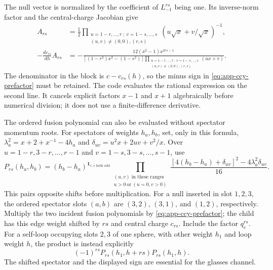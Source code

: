 The null vector is normalized by the coefficient of $L_{-1}^{rs}$ being
one. Its inverse-norm factor and the central-charge Jacobian give
\begin{align}
 A_{rs}&=\frac12
 \prod_{\substack{u=1-r,\ldots,r\ ;\ v=1-s,\ldots,s\\
                    (u,v)\ne(0,0),(r,s)}}
             (u\sqrt x+v/\sqrt x)^{-1},\nonumber\\
 -\frac{dc_{rs}}{dh}A_{rs}
 &=-\frac{12(x^2-1)x^{2rs-1}}
 {[(1-r^2)x^2-(1-s^2)]
  \displaystyle\prod_{\substack{u=1-r,\ldots,r\ ;\ v=1-s,\ldots,s\\
                    (u,v)\ne(0,0),(r,s)}}(ux+v)}.
 \label{eq:app-ccy-prefactor}
\end{align}
The denominator in the block is $c-c_{rs}(h)$, so the minus sign in
\eqref{eq:app-ccy-prefactor} must be retained. The code evaluates the
rational expression on the second line. It cancels explicit factors
$x-1$ and $x+1$ algebraically before numerical division; it does not
use a finite-difference derivative.

The ordered fusion polynomial can also be evaluated without spectator
momentum roots. For spectators of weights $h_a,h_b$, set, only in this
formula, $\lambda_a^2=x+2+x^{-1}-4h_a$ and
$\delta_{uv}=u^2x+2uv+v^2/x$. Over
$u=1-r,3-r,\ldots,r-1$ and $v=1-s,3-s,\ldots,s-1$, use
\begin{equation}
 P_{rs}(h_a,h_b)=
 (h_b-h_a)^{\mathbf1_{r,s\text{ both odd}}}
 \prod_{\substack{(u,v)\text{ in these ranges}\\u>0\ \text{or}\ (u=0,v>0)}}
 \frac{[4(h_b-h_a)+\delta_{uv}]^2-4\lambda_a^2\delta_{uv}}{16}.
 \label{eq:app-vir-fusion}
\end{equation}
This pairs opposite shifts before multiplication. For a null inserted in
slot $1,2,3$, the ordered spectator slots $(a,b)$ are $(3,2)$, $(3,1)$,
and $(1,2)$, respectively. Multiply the two incident fusion polynomials
by \eqref{eq:app-ccy-prefactor}; the child has this edge weight shifted
by $rs$ and central charge $c_{rs}$. Include the factor $q_e^{rs}$.
For a self-loop occupying slots $2,3$ of one sphere, with other weight
$h_1$ and loop weight $h$, the product is instead explicitly
\begin{equation}
 (-1)^{rs}P_{rs}(h_1,h+rs)P_{rs}(h_1,h).
 \label{eq:app-selfloop-residue}
\end{equation}
The shifted spectator and the displayed sign are essential for the
glasses channel.

